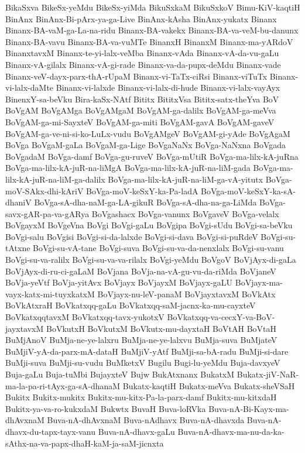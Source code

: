 {BikaSxva
BikeSx-yeMdu
BikeSx-yiMda
BikuSxkaM
BikuSxkoV
Bimu-KiV-kaqtiH
BinAnx
BinAnx-Bi-pArx-ya-ga-Live
BinAnx-kAsha
BinAnx-yukatx
Binanx
Binanx-BA-vaM-ga-La-na-ridu
Binanx-BA-vakekx
Binanx-BA-va-veM-bu-danunx
Binanx-BA-vavu
Binanx-BA-va-vuMTe
BinanxH
BinanxM
Binanx-ma-yARdoV
BinanxtavxM
Binanx-te-yi-lalx-veMba
Binanx-vAda
Binanx-vA-da-vu-gaLu
Binanx-vA-gilalx
Binanx-vA-gi-rade
Binanx-va-da-pupx-deMdu
Binanx-vade
Binanx-veV-dayx-parx-thA-rUpaM
Binanx-vi-TaTx-ciRsi
Binanx-viTuTx
Binanx-vi-lalx-daMte
Binanx-vi-lalxde
Binanx-vi-lalx-di-hude
Binanx-vi-lalx-vayAyx
BinenxY-sa-beVku
Bira-kaSx-NAtf
Bititx
BititxVsa
Bititx-satx-theYva
BoV
BoVgAM
BoVgAMga
BoVgAMgaM
BoVgAM-ga-dalilx
BoVgAM-ga-meVva
BoVgAM-ga-mi-SayxteV
BoVgAM-ga-miti
BoVgAM-gavA
BoVgAM-gaveV
BoVgAM-ga-ve-ni-si-ko-LuLx-vudu
BoVgAMgeV
BoVgAM-gi-yAde
BoVgAgaM
BoVga
BoVgaM-gaLa
BoVgaM-ga-Lige
BoVgaNaNx
BoVga-NaNxna
BoVgada
BoVgadaM
BoVga-damf
BoVga-gu-ruveV
BoVga-mUtiR
BoVga-ma-lilx-kA-juRna
BoVga-ma-lilx-kA-juR-na-liMgA
BoVga-ma-lilx-kA-juR-na-liM-gada
BoVga-ma-lilx-kA-juR-na-liM-ga-dalilx
BoVga-ma-lilx-kA-juR-na-liM-ga-vA-yitutx
BoVga-moV-SAkx-dhi-kAriV
BoVga-moV-keSxY-ka-Pa-ladA
BoVga-moV-keSxY-ka-sA-dhaniV
BoVga-sA-dha-naM-ga-LA-gikuR
BoVga-sA-dha-na-ga-LiMda
BoVga-savx-gAR-pa-va-gARya
BoVgashacx
BoVga-vanunx
BoVgaveV
BoVga-velalx
BoVgayxM
BoVgeVna
BoVgi
BoVgi-gaLu
BoVgipa
BoVgi-sUdu
BoVgi-sa-beVku
BoVgi-salu
BoVgisi
BoVgi-si-da-lalxde
BoVgi-si-dava
BoVgi-si-puRdeV
BoVgi-su-tAtxne
BoVgi-su-vA-tane
BoVgi-suva
BoVgi-su-va-da-nenxlalx
BoVgi-su-vanu
BoVgi-su-va-ralilx
BoVgi-su-va-va-rilalx
BoVgi-yeMdu
BoVgoV
BoVjAyx-di-gaLa
BoVjAyx-di-ru-ci-gaLaM
BoVjana
BoVja-na-vA-gu-vu-da-riMda
BoVjaneV
BoVja-yeVtf
BoVja-yitAvx
BoVjayx
BoVjayxM
BoVjayx-gaLU
BoVjayx-ma-vayx-katx-mi-tuyxkatxM
BoVjayx-nu-leV-panaM
BoVjayxtavxM
BoVkAtx
BoVkAtxraH
BoVkatxqq-gaLu
BoVkatxqq-saM-jacnx-ka-mu-cayxteV
BoVkatxqqtavxM
BoVkatxqq-tavx-yukotxV
BoVkatxqq-va-cecxY-va-BoV-jayxtavxM
BoVkutxH
BoVkutxM
BoVkutx-mu-dayxtaH
BoVtAH
BoVtaH
BuMjAnoV
BuMja-ne-ye-lalxru
BuMja-ne-ye-lalxvu
BuMja-suva
BuMjateV
BuMjiV-yA-da-parx-mA-dataH
BuMjiV-yAtf
BuMji-sa-bA-radu
BuMji-si-dare
BuMji-suva
BuMji-su-vudu
BuMketxV
Bugilu
Bugi-lu-yeMdu
Buja-davxyeV
Buja-gaLu
Buja-tuMbi
BujayxteV
Bujw
BukAtxnanx
BukatxM
Bukatx-jiV-NaR-ma-la-pa-ri-tAyx-ga-sA-dhanaM
Bukatx-kaqtiH
Bukatx-meVva
Bukatx-sheVSaH
Bukitx
Bukitx-mukitx
Bukitx-mu-kitx-Pa-la-parx-damf
Bukitx-mu-kitxdaH
Bukitx-ya-va-ro-kukxdaM
Bukwtx
BuvaH
Buva-loRVka
Buva-nA-Bi-Kayx-ma-dhAvxnaM
Buva-nA-dhAvxnaM
Buva-nAdhavx
Buva-nA-dhavxda
Buva-nA-dhavx-du-tapx-tayx-vanu
Buva-nA-dhavx-gaLu
Buva-nA-dhavx-ma-nu-da-ka-sAthx-na-va-papx-dhaH-kaM-ja-saM-jicnxta
}

